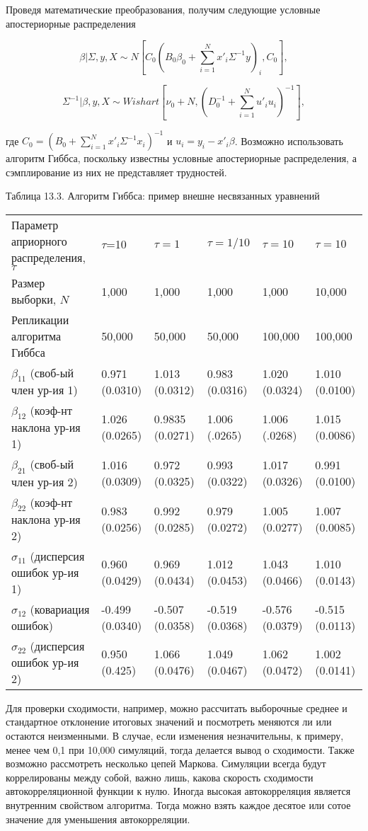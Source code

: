Проведя математические преобразования, получим следующие условные апостериорные распределения

\[
\beta|\Sigma,y,X{\sim}N\left[C_{0}\left(B_{0}\beta_{0}+\sum^{N}_{i=1}x'_{i}\Sigma^{-1}y\right)_{i},C_0\right], 
\]

\[
\Sigma^{-1}|\beta,y,X{\sim} Wishart \left[\nu_{0}+N,\left(D^{-1}_0+\sum^{N}_{i=1}u'_{i}u_{i}\right)^{-1}\right], 
\]

где $C_0=(B_{0}+\sum^{N}_{i=1}x'_{i}\Sigma^{-1}x_i)^{-1}$ и $u_{i}=y_{i}-x'_{i}\beta$. Возможно использовать алгоритм Гиббса, поскольку известны условные апостериорные распределения, а  сэмплирование из них не представляет трудностей.

Таблица 13.3. Алгоритм Гиббса: пример внешне несвязанных уравнений

\begin{tabular}{p{4cm}p{2cm}p{2cm}p{2cm}p{2cm}p{2cm}}
\hline 
Параметр априорного распределения, $\tau$ & $\tau$=10 & $\tau=1$ & $\tau=1/10$ & $\tau=10$ & $\tau=10$ \\ 
Размер выборки, $N$ & 1,000 & 1,000 & 1,000 & 1,000 & 10,000 \\ 
Репликации алгоритма Гиббса & 50,000 & 50,000 & 50,000 & 100,000 & 100,000 \\ 
\hline 
$\beta_{11}$ (своб-ый член ур-ия 1) &  0.971 (0.0310) & 1.013 (0.0312) & 0.983 (0.0316) & 1.020 (0.0324) & 1.010 (0.0100) \\ 
$\beta_{12}$ (коэф-нт наклона ур-ия 1) & 1.026 (0.0265) & 0.9835 (0.0271) & 1.006 (.0265) & 1.006 (.0268) & 1.015 (0.0086) \\ 
$\beta_{21}$ (своб-ый член ур-ия 2) & 1.016 (0.0309) & 0.972 (0.0325) & 0.993 (0.0322) & 1.017 (0.0326) & 0.991 (0.0100) \\ 
$\beta_{22}$ (коэф-нт наклона ур-ия 2) & 0.983 (0.0256) & 0.992 (0.0285) & 0.979 (0.0272) & 1.005 (0.0277) & 1.007 (0.0085) \\ 
$\sigma_{11}$ (дисперсия ошибок ур-ия 1) & 0.960 (0.0429) & 0.969 (0.0434) & 1.012 (0.0453) & 1.043 (0.0466) & 1.010 (0.0143) \\ 
$\sigma_{12}$ (ковариация ошибок) & -0.499 (0.0340) & -0.507 (0.0358) & -0.519 (0.0368) & -0.576 (0.0379) & -0.515 (0.0113) \\ 
$\sigma_{22}$ (дисперсия ошибок ур-ия 2) & 0.950 (0.425) & 1.066 (0.0476) & 1.049 (0.0467) & 1.062 (0.0472) & 1.002 (0.0141) \\ 
\hline 
\end{tabular} 

Для проверки сходимости, например, можно рассчитать выборочные среднее и стандартное отклонение итоговых значений и посмотреть меняются ли  или остаются неизменными. В случае, если изменения незначительны, к примеру, менее чем 0,1 при 10,000 симуляций, тогда делается вывод о сходимости. Также возможно рассмотреть несколько цепей Маркова. Симуляции всегда будут коррелированы между собой, важно лишь, какова скорость сходимости автокорреляционной функции к нулю. Иногда высокая автокорреляция является внутренним свойством алгоритма. Тогда можно взять каждое десятое или сотое значение для уменьшения автокорреляции. 

